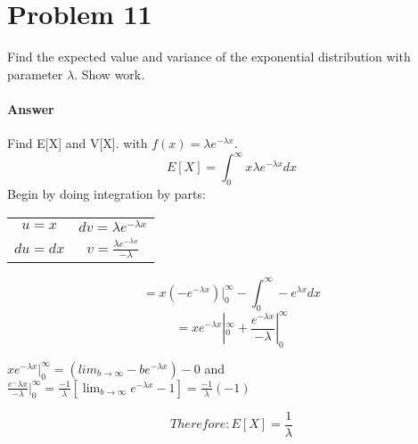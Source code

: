 \documentclass{article}
\begin{document}
	

\section*{Problem 11}

	Find the expected value and variance of the exponential distribution with parameter $\lambda$. 
	Show work.
	
	\paragraph{Answer}
	Find E[X] and V[X]. with $f(x) = \lambda e^{-\lambda x}$.
	\begin{displaymath}
		E[X] = \int_{0}^{\infty} x\lambda e^{-\lambda x} dx
	\end{displaymath}
	Begin by doing integration by parts:
	\begin{tabular}{ c c }
		$u = x$ & $dv= \lambda e^{-\lambda x}$ \\
		$du=dx$ & $v=\frac{\lambda e^{-\lambda x}}{-\lambda}$
	\end{tabular}
	\begin{displaymath}
		= x(-e^{-\lambda x})|_{0}^{\infty} - \int_{0}^{\infty} -e^{\lambda x} dx
	\end{displaymath}
	\begin{displaymath}
		= xe^{-\lambda x}|_{0}^{\infty} + \frac{e^{-\lambda x}}{-\lambda}|_{0}^{\infty}
	\end{displaymath}
	\centerline{$xe^{-\lambda x}|_{0}^{\infty} = (lim_{b\to\infty}-be^{-\lambda x}) - 0$ and $\frac{e^-\lambda x}{-\lambda}|_{0}^{\infty} = \frac{-1}{\lambda}\left[\lim_{b\to\infty}e^{-\lambda x} - 1\right] = \frac{-1}{\lambda}(-1)$}
	\begin{displaymath}
		Therefore: E[X] = \frac{1}{\lambda}
	\end{displaymath}
	
\end{document}
